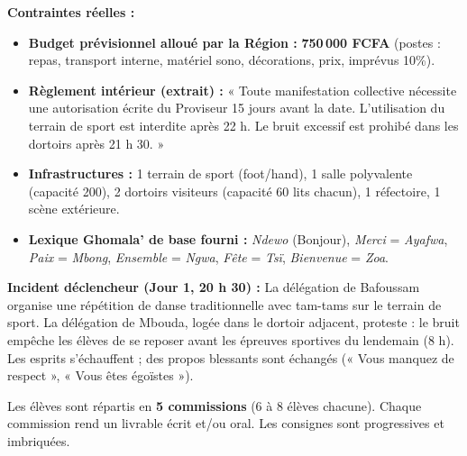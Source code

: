 \documentclass[11pt]{article}
\newcounter{popsec}
\newcounter{popsub}
\newcommand{\courssub}[1]{%
  \stepcounter{popsub}%
  \par\vspace{9pt}\noindent{\popxbold\fontsize{11.5}{13}\selectfont\color{popink}{\color{poporange}\thepopsec.\thepopsub}\hspace{6pt}#1}\par\nopagebreak\vspace{4pt}
}
\begin{document}
\textbf{Contraintes réelles :}
\begin{itemize}
    \item \textbf{Budget prévisionnel alloué par la Région :} \textbf{750\,000 FCFA} (postes : repas, transport interne, matériel sono, décorations, prix, imprévus 10\%).
    \item \textbf{Règlement intérieur (extrait) :} « Toute manifestation collective nécessite une autorisation écrite du Proviseur 15 jours avant la date. L'utilisation du terrain de sport est interdite après 22 h. Le bruit excessif est prohibé dans les dortoirs après 21 h 30. »
    \item \textbf{Infrastructures :} 1 terrain de sport (foot/hand), 1 salle polyvalente (capacité 200), 2 dortoirs visiteurs (capacité 60 lits chacun), 1 réfectoire, 1 scène extérieure.
    \item \textbf{Lexique Ghomala' de base fourni :} \emph{Ndewo} (Bonjour), \emph{Merci} = \emph{Ayafwa}, \emph{Paix} = \emph{Mbong}, \emph{Ensemble} = \emph{Ngwa}, \emph{Fête} = \emph{Tsï}, \emph{Bienvenue} = \emph{Zoa}.
\end{itemize}

\textbf{Incident déclencheur (Jour 1, 20 h 30) :} La délégation de Bafoussam organise une répétition de danse traditionnelle avec tam-tams sur le terrain de sport. La délégation de Mbouda, logée dans le dortoir adjacent, proteste : le bruit empêche les élèves de se reposer avant les épreuves sportives du lendemain (8 h). Les esprits s'échauffent ; des propos blessants sont échangés (« Vous manquez de respect », « Vous êtes égoïstes »).

\courssub{Consignes}
Les élèves sont répartis en \textbf{5 commissions} (6 à 8 élèves chacune). Chaque commission rend un livrable écrit et/ou oral. Les consignes sont progressives et imbriquées.
\end{document}
